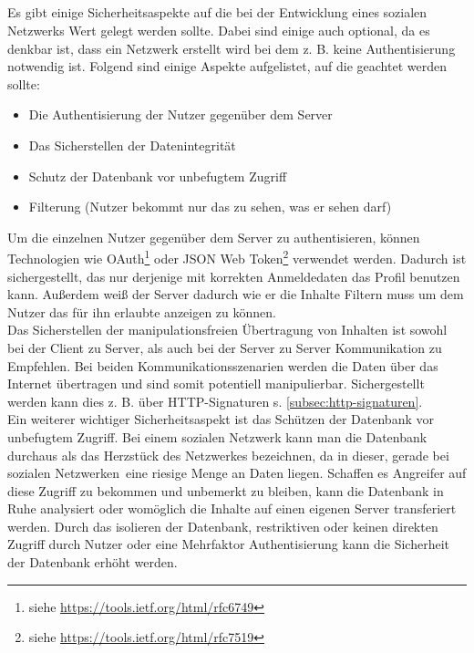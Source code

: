 	\subsection{
	}
	Es gibt einige Sicherheitsaspekte auf die bei der Entwicklung eines sozialen Netzwerks Wert gelegt werden sollte. Dabei sind einige auch optional, da es denkbar ist, dass ein Netzwerk erstellt wird bei dem z. B. keine Authentisierung notwendig ist. Folgend sind einige Aspekte aufgelistet, auf die geachtet werden sollte:
	\begin{itemize}
		\item Die Authentisierung der Nutzer gegenüber dem Server
		\item Das Sicherstellen der Datenintegrität
		\item Schutz der Datenbank vor unbefugtem Zugriff
		\item Filterung (Nutzer bekommt nur das zu sehen, was er sehen darf)
	\end{itemize}
	Um die einzelnen Nutzer gegenüber dem Server zu authentisieren, können Technologien wie OAuth\footnote{siehe \url{https://tools.ietf.org/html/rfc6749}} oder JSON Web Token\footnote{siehe \url{https://tools.ietf.org/html/rfc7519}} verwendet werden. Dadurch ist sichergestellt, das nur derjenige mit korrekten Anmeldedaten das Profil benutzen kann. Außerdem weiß der Server dadurch wie er die Inhalte Filtern muss um dem Nutzer das für ihn erlaubte anzeigen zu können.~\\
	
	Das Sicherstellen der manipulationsfreien Übertragung von Inhalten ist sowohl bei der Client zu Server, als auch bei der Server zu Server Kommunikation zu Empfehlen. Bei beiden Kommunikationsszenarien werden die Daten über das Internet übertragen und sind somit potentiell manipulierbar. Sichergestellt werden kann dies z. B. über HTTP-Signaturen s. \ref{subsec:http-signaturen}.~\\
	
	Ein weiterer wichtiger Sicherheitsaspekt ist das Schützen der Datenbank vor unbefugtem Zugriff. Bei einem sozialen Netzwerk kann man die Datenbank durchaus als das Herzstück des Netzwerkes bezeichnen, da in dieser, gerade bei \glqq sozialen Netzwerken\grqq~eine riesige Menge an Daten liegen. Schaffen es Angreifer auf diese Zugriff zu bekommen und unbemerkt zu bleiben, kann die Datenbank in Ruhe analysiert oder womöglich die Inhalte auf einen eigenen Server transferiert werden. Durch das isolieren der Datenbank, restriktiven oder keinen direkten Zugriff durch Nutzer oder eine Mehrfaktor Authentisierung kann die Sicherheit der Datenbank erhöht werden.
